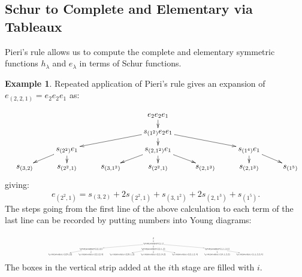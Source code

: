 \documentclass[11pt]{amsart}
\theoremstyle{definition}
\theoremstyle{example}
\newtheorem{example}[theorem]{Example}
\begin{document}
\subsection{Schur to Complete and Elementary via Tableaux}
Pieri's rule allows us to compute the complete and elementary symmetric functions $h_\lambda$ and $e_\lambda$ in terms of Schur functions.
\begin{example}
  \label{example:expansion-e}
  Repeated application of Pieri's rule gives an expansion of $e_{(2, 2, 1)} = e_2e_2e_1$ as:
  \begin{displaymath}
    \resizebox{\textwidth}{!}{
      \xymatrix@R-15pt{
        &&&e_2 e_2 e_1\ar[d]&&&\\
        &&&s_{(1^2)} e_2 e_1\ar[dll]\ar[d]\ar[drr]&&\\
        &s_{(2^2)}e_1\ar[dl]\ar[d] && s_{(2, 1^2)}e_1\ar[dl]\ar[d]\ar[dr] && s_{(1^4)}e_1 \ar[d]\ar[dr]&\\
        s_{(3, 2)} & s_{(2^2, 1)} & s_{(3, 1^2)} & s_{(2^2, 1)} & s_{(2, 1^3)} & s_{(2, 1^3)} & s_{(1^5)}
      }
    }
  \end{displaymath}
  giving:
  \begin{displaymath}
    e_{(2^2,1)} = s_{(3,2)} + 2s_{(2^2,1)} + s_{(3,1^2)} + 2s_{(2,1^3)} + s_{(1^5)}.
  \end{displaymath}
  The steps going from the first line of the above calculation to each term of the last line can be recorded by putting numbers into Young diagrams:
  \begin{displaymath}
    \resizebox{0.75\textwidth}{!}{
      \xymatrix@R-15pt{
        &&&\emptyset\ar[d]&&&\\
        &&&\ytableaushort{1,1}\ar[dll]\ar[d]\ar[drr]&&\\
        &\ytableaushort{12,12}\ar[dl]\ar[d] && \ytableaushort{12,1,2}\ar[dl]\ar[d]\ar[dr] && \ytableaushort{1,1,2,2}\ar[d]\ar[dr]&\\
        \ytableaushort{123,12} & \ytableaushort{12,12,3} & \ytableaushort{123,1,2} & \ytableaushort{12,13,2} & \ytableaushort{12,1,2,3} & \ytableaushort{13,1,2,2} & \ytableaushort{1,1,2,2,3}
      }
    }
  \end{displaymath}
  The boxes in the vertical strip added at the $i$th stage are filled with $i$.
\end{example}
\end{document}
